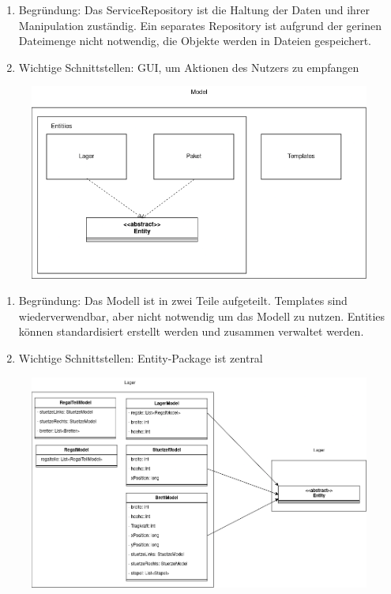 \begin{enumerate}
    \item Begründung: Das ServiceRepository ist die Haltung der Daten und ihrer Manipulation zuständig. Ein separates Repository ist aufgrund der gerinen Dateimenge nicht notwendig, die Objekte werden in Dateien gespeichert.
    \item Wichtige Schnittstellen: GUI, um Aktionen des Nutzers zu empfangen
\end{enumerate}
\begin{figure}[H]
    \includegraphics[width=\linewidth]{images/bausteinsicht/Ebene3_Model.png}
    \label{fig:Model}
\end{figure}
\begin{enumerate}
    \item Begründung: Das Modell ist in zwei Teile aufgeteilt. Templates sind wiederverwendbar, aber nicht notwendig um das Modell zu nutzen. Entities können standardisiert erstellt werden und zusammen verwaltet werden.
    \item Wichtige Schnittstellen: Entity-Package ist zentral
\end{enumerate}
\begin{figure}[H]
    \includegraphics[width=\linewidth]{images/bausteinsicht/Ebene4_Lager.png}
    \label{fig:Lager}
\end{figure}
